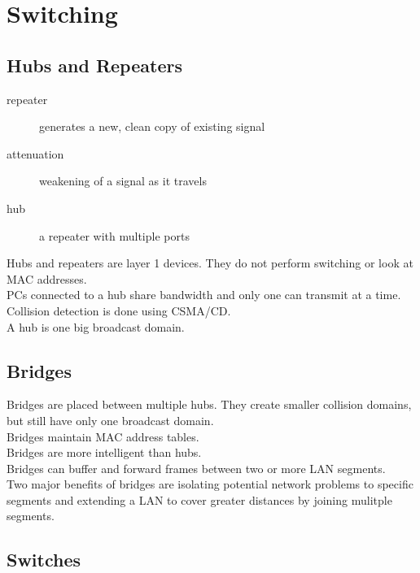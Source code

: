 \section{Switching}

\subsection{Hubs and Repeaters}

\begin{description}

\item[repeater]
generates a new, clean copy of existing signal

\item[attenuation]
weakening of a signal as it travels

\item[hub]
a repeater with multiple ports

\end{description}

Hubs and repeaters are layer 1 devices. They do not perform switching or look
at MAC addresses.\\

PCs connected to a hub share bandwidth and only one can transmit at a time.
Collision detection is done using CSMA/CD.\\

A hub is one big broadcast domain.

\subsection{Bridges}

Bridges are placed between multiple hubs. They create smaller collision
domains, but still have only one broadcast domain.\\

Bridges maintain MAC address tables.\\

Bridges are more intelligent than hubs.\\

Bridges can buffer and forward frames between two or more LAN segments.\\

Two major benefits of bridges are isolating potential network problems to
specific segments and extending a LAN to cover greater distances by joining
mulitple segments.

\subsection{Switches}

